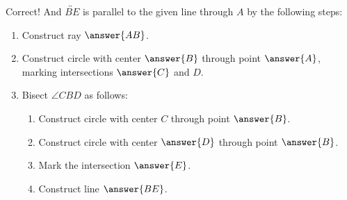\documentclass[nooutcomes]{ximera}
\begin{document}
\begin{problem}
\begin{problem}
Correct!  And $\overleftrightarrow{BE}$ is parallel to the given line through $A$ by the following steps: 
\begin{enumerate}
\item Construct ray $\answer{AB}$. 
\item Construct circle with center $\answer{B}$ through point $\answer{A}$, marking intersections $\answer{C}$ and $D$. 
\item Bisect $\angle CBD$ as follows: 
\begin{enumerate}
\item Construct circle with center $C$ through point $\answer{B}$. 
\item Construct circle with center $\answer{D}$ through point $\answer{B}$.
\item Mark the intersection $\answer{E}$.
\item Construct line $\answer{BE}$. 
\end{enumerate}
\end{enumerate}


\end{problem}
\end{problem}
\end{document}
